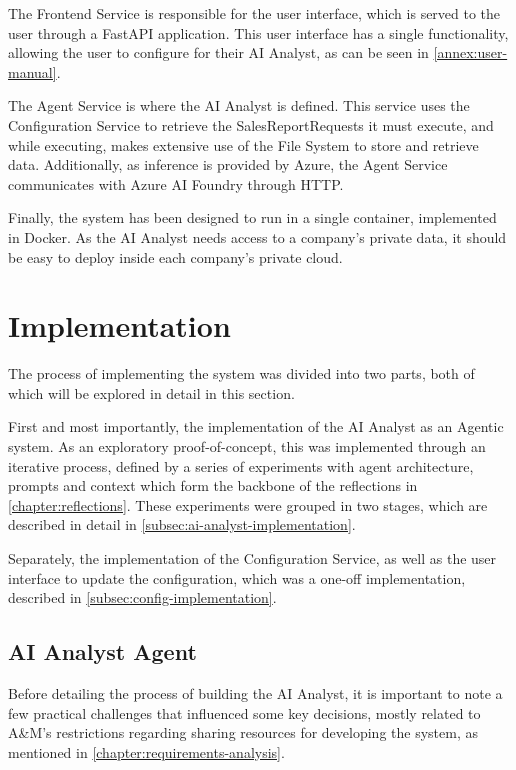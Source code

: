 \documentclass[a4paper]{report}
\begin{document}
The Frontend Service is responsible for the user interface, which is served to the user through a FastAPI application. This user interface has a single functionality, allowing the user to configure for their AI Analyst, as can be seen in \autoref{annex:user-manual}. 

The Agent Service is where the AI Analyst is defined. This service uses the Configuration Service to retrieve the SalesReportRequests it must execute, and while executing, makes extensive use of the File System to store and retrieve data. Additionally, as inference is provided by Azure, the Agent Service communicates with Azure AI Foundry through HTTP.

Finally, the system has been designed to run in a single container, implemented in Docker. As the AI Analyst needs access to a company's private data, it should be easy to deploy inside each company's private cloud.

\section{Implementation}
\label{sec:implementation}

The process of implementing the system was divided into two parts, both of which will be explored in detail in this section.

First and most importantly, the implementation of the AI Analyst as an Agentic system. As an exploratory proof-of-concept, this was implemented through an iterative process, defined by a series of experiments with agent architecture, prompts and context which form the backbone of the reflections in \autoref{chapter:reflections}. These experiments were grouped in two stages, which are described in detail in \autoref{subsec:ai-analyst-implementation}.

Separately, the implementation of the Configuration Service, as well as the user interface to update the configuration, which was a one-off implementation, described in \autoref{subsec:config-implementation}.

\subsection{AI Analyst Agent}
\label{subsec:ai-analyst-implementation}

Before detailing the process of building the AI Analyst, it is important to note a few practical challenges that influenced some key decisions, mostly related to A\&M's restrictions regarding sharing resources for developing the system, as mentioned in \autoref{chapter:requirements-analysis}.
\end{document}
